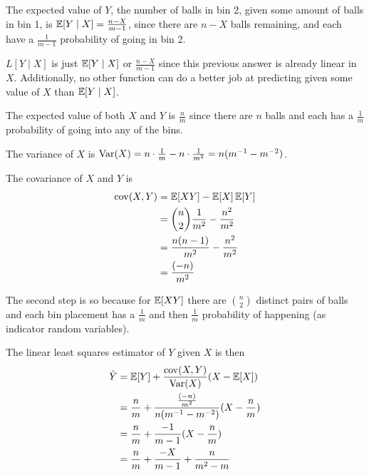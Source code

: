 \documentclass[11pt]{article}
\begin{document}
\begin{solution}
	
\begin{Parts}
	
\Part The expected value of $Y$, the number of balls in bin 2, given some amount 
of balls in bin 1, is $\operatorname{\mathbb{E}}[Y \mid X] = \frac{n-X}{m-1}$, since there are $n-X$ 
balls remaining, and each have a $\frac{1}{m-1}$ probability of going in bin 2.

\Part $L[Y \mid X]$ is just $\operatorname{\mathbb{E}}[Y \mid X]$ or $\frac{n-X}{m-1}$ since this 
previous answer is already linear in $X$. Additionally, no other function can
do a better job at predicting given some value of $X$ than $\operatorname{\mathbb{E}}[Y \mid X]$. 

\Part The expected value of both $X$ and $Y$ is $\frac{n}{m}$ since there are $n$
balls and each has a $\frac{1}{m}$ probability of going into any of the bins. 

\Part The variance of $X$ is $\operatorname{Var}(X) = n \cdot \frac{1}{m} - n \cdot \frac{1}{m^2}
= n (m^{-1} - m^{-2})$.

\Part The covariance of $X$ and $Y$ is
\[
	\begin{split}
		\operatorname{cov}(X, Y) &= \operatorname{\mathbb{E}}[XY] - \operatorname{\mathbb{E}}[X]\operatorname{\mathbb{E}}[Y] \\
		&= \binom{n}{2} \frac{1}{m^2} - \frac{n^2}{m^2} \\
		&= \frac{n(n-1)}{m^2} - \frac{n^2}{m^2} \\
		&= \frac{(-n)}{m^2}
	\end{split}
\]

The second step is so because for $\operatorname{\mathbb{E}}[XY]$ there are $\binom{n}{2}$ distinct pairs
of balls and each bin placement has a $\frac{1}{m}$ and then $\frac{1}{m}$ 
probability of happening (as indicator random variables). 

\Part The linear least squares estimator of $Y$ given $X$ is then
\[
	\begin{split}
		\hat{Y} &= \operatorname{\mathbb{E}}[Y] + \frac{\operatorname{cov}(X, Y)}{\operatorname{Var}(X)}(X - \operatorname{\mathbb{E}}[X]) \\
		&= \frac{n}{m} + \frac{\frac{(-n)}{m^2}}{n (m^{-1} - m^{-2})}(X - \frac{n}{m}) \\
		&= \frac{n}{m} + \frac{-1}{m-1}(X - \frac{n}{m}) \\
		&= \frac{n}{m} + \frac{-X}{m-1}+ \frac{n}{m^2-m} \\
	\end{split}
\]


\end{Parts}

\end{solution}
\end{document}
